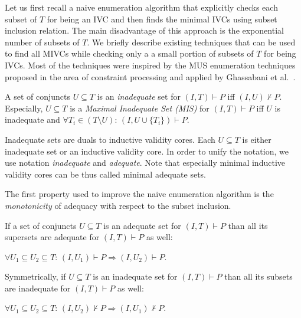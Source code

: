 \newcommand{\fUnex}{f_{\mathit{Unexplored}}}
Let us first recall
a naive enumeration algorithm that   explicitly checks each subset of $T$ for being an IVC  and then finds the minimal IVCs  using subset inclusion relation. The main disadvantage of this approach is the   exponential number of subsets of $T$.
We briefly describe existing techniques that can be used to find all MIVCs while checking only a a small portion of subsets of $T$  for being IVCs.  Most of the techniques were inspired by the MUS enumeration techniques~\cite{}   proposed in the area of constraint processing and applied by Ghassabani et al.~\cite{}.






\begin{definition}[Inadequacy] A set of conjuncts  $U \subseteq T$  is an \emph{inadequate} set for $(I, T) \vdash P$ iff $(I, U) \nvdash P$. Especially, $U \subseteq T$ is a \emph{Maximal Inadequate Set (MIS)} for $(I, T) \vdash P$ iff $U$ is inadequate and $\forall T_i \in (T \setminus U): \, (I, U \cup \{ T_i\}) \vdash P$.
\end{definition}

Inadequate sets are duals to inductive validity cores. Each $U \subseteq T$ is either inadequate set or an inductive validity core. In order to unify the notation, we   use notation \emph{inadequate} and \emph{adequate}. Note that especially minimal inductive validity cores can be thus called  minimal adequate sets.



The first property used to improve the naive enumeration algorithm is the \emph{monotonicity} of  adequacy   with respect to the subset inclusion.

\begin{lemma}[Monotonicity]
\label{lemma:monotonicity}
If a set of conjuncts  $U \subseteq T$  is an adequate set for $(I, T) \vdash P$   than all its supersets are adequate for  $(I, T) \vdash P$ as well:
\begin{center}
$\forall U_1 \subseteq U_2 \subseteq T: \, (I, U_1) \vdash P \Rightarrow (I, U_2) \vdash P$.
\end{center}
Symmetrically, if   $U \subseteq T$  is an inadequate set for $(I, T) \vdash P$   than all its subsets are inadequate for  $(I, T) \vdash P$ as well:
\begin{center}
$\forall U_1 \subseteq U_2 \subseteq T: \, (I, U_2) \nvdash P \Rightarrow (I, U_1) \nvdash P$.
\end{center}
\end{lemma}


